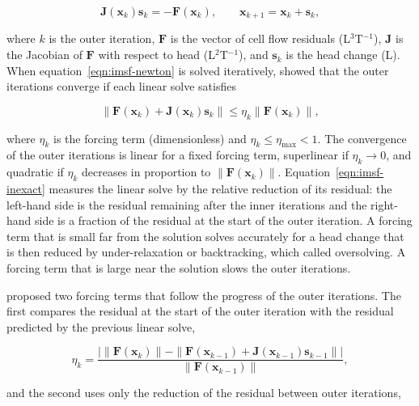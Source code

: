 \begin{equation}
	\label{eqn:imsf-newton}
	\mathbf{J}(\mathbf{x}_k) \mathbf{s}_k = -\mathbf{F}(\mathbf{x}_k), \qquad \mathbf{x}_{k+1} = \mathbf{x}_k + \mathbf{s}_k ,
\end{equation}

\noindent where $k$ is the outer iteration, $\mathbf{F}$ is the vector of cell flow residuals (L$^3$T$^{-1}$), $\mathbf{J}$ is the Jacobian of $\mathbf{F}$ with respect to head (L$^2$T$^{-1}$), and $\mathbf{s}_k$ is the head change (L). When equation~\ref{eqn:imsf-newton} is solved iteratively, \cite{dembo1982inexact} showed that the outer iterations converge if each linear solve satisfies

\begin{equation}
	\label{eqn:imsf-inexact}
	\| \mathbf{F}(\mathbf{x}_k) + \mathbf{J}(\mathbf{x}_k) \mathbf{s}_k \| \le \eta_k \| \mathbf{F}(\mathbf{x}_k) \| ,
\end{equation}

\noindent where $\eta_k$ is the forcing term (dimensionless) and $\eta_k \le \eta_{\max} < 1$. The convergence of the outer iterations is linear for a fixed forcing term, superlinear if $\eta_k \to 0$, and quadratic if $\eta_k$ decreases in proportion to $\| \mathbf{F}(\mathbf{x}_k) \|$. Equation~\ref{eqn:imsf-inexact} measures the linear solve by the relative reduction of its residual: the left-hand side is the residual remaining after the inner iterations and the right-hand side is a fraction of the residual at the start of the outer iteration. A forcing term that is small far from the solution solves accurately for a head change that is then reduced by under-relaxation or backtracking, which \cite{eisenstat1996forcing} called oversolving. A forcing term that is large near the solution slows the outer iterations.

\cite{eisenstat1996forcing} proposed two forcing terms that follow the progress of the outer iterations. The first compares the residual at the start of the outer iteration with the residual predicted by the previous linear solve,

\begin{equation}
	\label{eqn:imsf-choice1}
	\eta_k = \frac{\left| \| \mathbf{F}(\mathbf{x}_k) \| - \| \mathbf{F}(\mathbf{x}_{k-1}) + \mathbf{J}(\mathbf{x}_{k-1}) \mathbf{s}_{k-1} \| \right|}{\| \mathbf{F}(\mathbf{x}_{k-1}) \|} ,
\end{equation}

\noindent and the second uses only the reduction of the residual between outer iterations,

